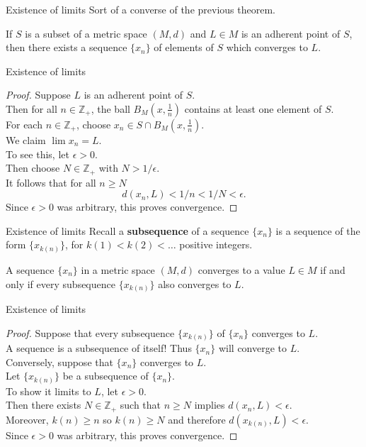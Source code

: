 \documentclass{beamer}
\begin{document}
\begin{frame}{Existence of limits}
Sort of a converse of the previous theorem.
\pause
\begin{thm}
If $S$ is a subset of a metric space $(M,d)$ and $L\in M$ is an adherent point of $S$, then there exists a sequence $\{x_n\}$ of elements of $S$ which converges to $L$.
\end{thm}
\end{frame}

\begin{frame}{Existence of limits}
\begin{proof}
Suppose $L$ is an adherent point of $S$.\\
\pause
Then for all $n\in\mathbb{Z}_+$, the ball $B_M(x,\frac{1}{n})$ contains at least one element of $S$.\\
\pause
For each $n\in\mathbb{Z}_+$, choose $x_n\in S\cap B_M(x,\frac{1}{n})$.\\
\pause
We claim $\lim x_n = L$.\\
\pause
To see this, let $\epsilon > 0$.\\
\pause
Then choose $N\in\mathbb{Z}_+$ with $N>1/\epsilon$.\\
\pause
It follows that for all $n\geq N$
$$d(x_n,L) < 1/n < 1/N < \epsilon.$$
\pause
Since $\epsilon > 0$ was arbitrary, this proves convergence.
\end{proof}
\end{frame}

\begin{frame}{Existence of limits}
Recall a \textbf{subsequence} of a sequence $\{x_n\}$ is a sequence of the form $\{x_{k(n)}\}$, for $k(1) < k(2) < \dots$ positive integers.
\pause
\begin{thm}
A sequence $\{x_n\}$ in a metric space $(M,d)$ converges to a value $L\in M$ if and only if every subsequence $\{x_{k(n)}\}$ also converges to $L$.
\end{thm}
\end{frame}

\begin{frame}{Existence of limits}
\begin{proof}
Suppose that every subsequence $\{x_{k(n)}\}$ of $\{x_n\}$ converges to $L$.\\
\pause
A sequence is a subsequence of itself!  Thus $\{x_n\}$ will converge to $L$.\\
\pause
Conversely, suppose that $\{x_n\}$ converges to $L$.\\
\pause
Let $\{x_{k(n)}\}$ be a subsequence of $\{x_n\}$.\\
\pause
To show it limits to $L$, let $\epsilon > 0$.\\
\pause
Then there exists $N\in\mathbb{Z}_+$ such that $n\geq N$ implies $d(x_n,L)<\epsilon$.\\
\pause
Moreover, $k(n)\geq n$ so $k(n)\geq N$ and therefore $d(x_{k(n)}, L) < \epsilon$.\\
\pause
Since $\epsilon > 0$ was arbitrary, this proves convergence.
\end{proof}
\end{frame}
\end{document}
